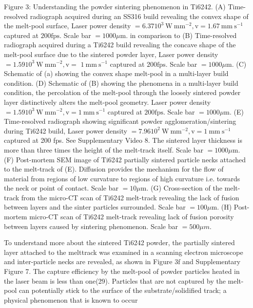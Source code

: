 \documentclass[10pt]{article}
\begin{document}
Figure 3: Understanding the powder sintering phenomenon in Ti6242. (A) Time-resolved radiograph acquired during an SS316 build revealing the convex shape of the melt-pool surface, Laser power density $=6.3710^{3} \mathrm{~W} \mathrm{~mm}^{-2}, \mathrm{v}=1.67 \mathrm{~mm} \mathrm{~s}^{-1}$ captured at $200 \mathrm{fps}$. Scale bar $=1000 \mu \mathrm{m}$. in comparison to (B) Time-resolved radiograph acquired during a Ti6242 build revealing the concave shape of the melt-pool surface due to the sintered powder layer, Laser power density $=1.5910^{3} \mathrm{~W} \mathrm{~mm}^{-2}, \mathrm{v}=$ $1 \mathrm{~mm} \mathrm{~s}^{-1}$ captured at $200 \mathrm{fps}$. Scale bar $=1000 \mu \mathrm{m}$. (C) Schematic of (a) showing the convex shape melt-pool in a multi-layer build condition. (D) Schematic of (B) showing the phenomena in a multi-layer build condition, the percolation of the melt-pool through the loosely sintered powder layer distinctively alters the melt-pool geometry. Laser power density $=1.5910^{3} \mathrm{~W} \mathrm{~mm}^{-2}, \mathrm{v}=1 \mathrm{~mm} \mathrm{~s}^{-1}$ captured at $200 \mathrm{fps}$. Scale bar $=1000 \mu \mathrm{m}$. (E) Time-resolved radiograph showing significant powder agglomeration/sintering during Ti6242 build, Laser power density $=7.9610^{2} \mathrm{~W} \mathrm{~mm}^{-2}, \mathrm{v}=1 \mathrm{~mm} \mathrm{~s}^{-1}$ captured at 200 fps. See Supplementary Video 8. The sintered layer thickness is more than three times the height of the melt-track itself. Scale bar $=1000 \mu \mathrm{m}$. (F) Post-mortem SEM image of Ti6242 partially sintered particle necks attached to the melt-track of (E). Diffusion provides the mechanism for the flow of material from regions of low curvature to regions of high curvature i.e. towards the neck or point of contact. Scale bar $=10 \mu \mathrm{m}$. (G) Cross-section of the melt-track from the micro-CT scan of Ti6242 melt-track revealing the lack of fusion between layers and the sinter particles surrounded. Scale bar $=100 \mu \mathrm{m}$. (H) Post-mortem micro-CT scan of Ti6242 melt-track revealing lack of fusion porosity between layers caused by sintering phenomenon. Scale bar $=500 \mu m$.

To understand more about the sintered Ti6242 powder, the partially sintered layer attached to the melttrack was examined in a scanning electron microscope and inter-particle necks are revealed, as shown in Figure $3 \mathrm{f}$ and Supplementary Figure 7. The capture efficiency by the melt-pool of powder particles heated in the laser beam is less than one(29). Particles that are not captured by the melt-pool can potentially stick to the surface of the substrate/solidified track; a physical phenomenon that is known to occur
\end{document}
